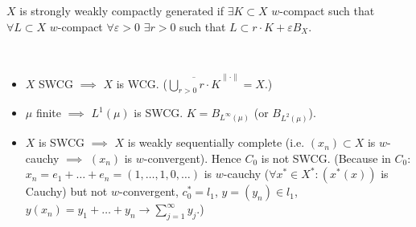 \documentclass[12pt]{article}					%
\begin{document}
\begin{definice}
	$X$ is strongly weakly compactly generated if $\exists K \subset X$ $w$-compact such that $\forall L \subset X$ $w$-compact $\forall ε > 0$ $\exists r > 0$ such that $L \subset r·K + ε B_X$.

	\begin{poznamkain}
		\ 
		\begin{itemize}
			\item $X$ SWCG $\implies$ $X$ is WCG. ($\overline{\bigcup_{r > 0} r·K}^{\|·\|} = X$.)
			\item $μ$ finite $\implies$ $L^1(μ)$ is SWCG. $K = B_{L^∞(μ)}$ (or $B_{L^2(μ)}$).
			\item $X$ is SWCG $\implies$ $X$ is weakly sequentially complete (i.e. $(x_n) \subset X$ is $w$-cauchy $\implies$ $(x_n)$ is $w$-convergent). Hence $C_0$ is not SWCG. (Because in $C_0$: $x_n = e_1 + … + e_n = (1, …, 1, 0, …)$ is $w$-cauchy ($\forall x^* \in X^*: (x^*(x))$ is Cauchy) but not $w$-convergent, $c_0^* = l_1$, $y = (y_n) \in l_1$, $y(x_n) = y_1 + … + y_n \rightarrow \sum_{j=1}^∞ y_j$.)
		\end{itemize}
	\end{poznamkain}
\end{definice}
\end{document}
